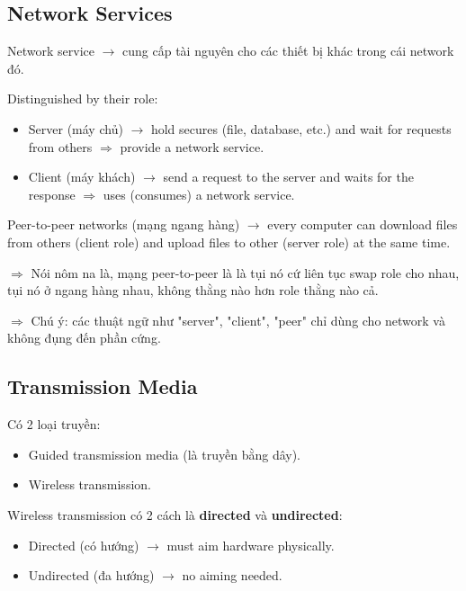 \medskip

\subsection{Network Services}

\noindent
Network service $\rightarrow$ cung cấp tài nguyên cho các thiết bị khác trong cái network đó.
\medskip

\noindent
Distinguished by their role:
\begin{itemize}
    \item Server (máy chủ) $\rightarrow$ hold secures (file, database, etc.) and wait for requests from others $\Rightarrow$ provide a network service.
    \item Client (máy khách) $\rightarrow$ send a request to the server and waits for the response $\Rightarrow$ uses (consumes) a network service.
\end{itemize}
\medskip

\noindent
Peer-to-peer networks (mạng ngang hàng) $\rightarrow$ every computer can download files from others (client role) and upload files to other (server role) at the same time.
\medskip

$\Rightarrow$ Nói nôm na là, mạng peer-to-peer là là tụi nó cứ liên tục swap role cho nhau, tụi nó ở ngang hàng nhau, không thằng nào hơn role thằng nào cả.
\medskip

\vspace{0.2cm}

\noindent
$\Rightarrow$ Chú ý: các thuật ngữ như "server", "client", "peer" chỉ dùng cho network và không đụng đến phần cứng.

\subsection{Transmission Media}

\noindent
Có 2 loại truyền:

\begin{itemize}
    \item Guided transmission media (là truyền bằng dây).
    \item Wireless transmission.
\end{itemize}

\noindent
Wireless transmission có 2 cách là \textbf{directed} và \textbf{undirected}:

\begin{itemize}
    \item Directed (có hướng) $\rightarrow$ must aim hardware physically.
    \item Undirected (đa hướng) $\rightarrow$ no aiming needed.
\end{itemize}

